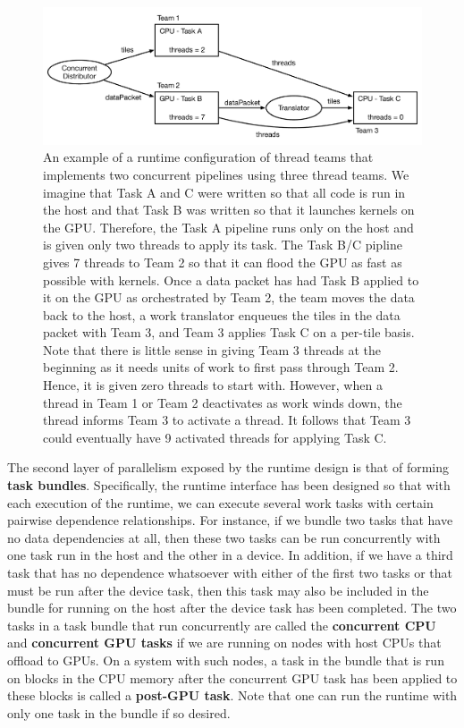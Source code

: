 \documentclass{article}
\begin{document}
\begin{figure}[!ht]
\begin{center}
\includegraphics[width=5.5in]{ConcurrentItorExample.pdf}
\caption[]{An example of a runtime configuration of thread teams that implements
two concurrent pipelines using three thread teams.  We imagine that Task A and C
were written so that all code is run in the host and that Task B was written so
that it launches kernels on the GPU.  Therefore, the Task A pipeline runs only
on the host and is given only two threads to apply its task.  The Task B/C pipline
gives 7 threads to Team 2 so that it can flood the GPU as fast as possible with
kernels.  Once a data packet has had Task B applied to it on the GPU as
orchestrated by Team 2, the team moves the data back to the host, a work
translator enqueues the tiles in the data packet with Team 3, and Team 3 applies
Task C on a per-tile basis.  Note that there is little sense in giving Team 3
threads at the beginning as it needs units of work to first pass through Team 2.
Hence, it is given zero threads to start with.  However, when a thread in Team 1
or Team 2 deactivates as work winds down, the thread informs Team 3 to activate
a thread.  It follows that Team 3 could eventually have 9 activated threads
for applying Task C.}
\label{fig:ConcurrentItor}
\end{center}
\end{figure}

The second layer of parallelism exposed by the runtime design is that of forming
\textbf{task bundles}.  Specifically, the runtime interface has been designed so
that with each execution of the runtime, we can execute several work tasks with
certain pairwise dependence relationships.  For instance, if we bundle two tasks
that have no data dependencies at all, then these two tasks can be run
concurrently with one task run in the host and the other in a device.  In
addition, if we have a third task that has no dependence whatsoever with either
of the first two tasks or that must be run after the device task, then this
task may also be included in the bundle for running on the host after the device
task has been completed.  The two tasks in a task bundle that run concurrently
are called the \textbf{concurrent CPU} and \textbf{concurrent GPU tasks} if we are
running on nodes with host CPUs that offload to GPUs.  On a system with such nodes, a
task in the bundle that is run on blocks in the CPU memory after the concurrent
GPU task has been applied to these blocks is called a \textbf{post-GPU
task}.  Note that one can run the runtime with only one task in the bundle
if so desired.\\
\end{document}
